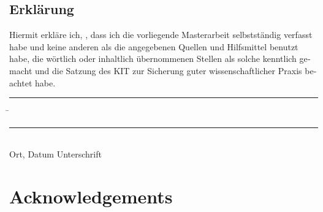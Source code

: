 \documentclass[parskip=no,12pt,a4paper,twoside,headings=openright, fleqn]{scrreprt}
\begin{document}



\begin{otherlanguage}{ngerman}
\chapter*{Erklärung}
\pagestyle{empty}

  \vspace{20mm}
  Hiermit erkläre ich, \theauthor, dass ich die vorliegende Masterarbeit selbst\-ständig
verfasst habe und keine anderen als die angegebenen Quellen und Hilfsmittel
benutzt habe, die wörtlich oder inhaltlich übernommenen Stellen als solche kenntlich gemacht und
die Satzung des KIT zur Sicherung guter wissenschaftlicher Praxis beachtet habe.
  \vspace{20mm}
  \begin{tabbing}
  \rule{7cm}{.4pt}\hspace{1cm} \= \rule{6.8cm}{.4pt} \\
 Ort, Datum \> Unterschrift
  \end{tabbing}
\end{otherlanguage}

\chapter*{Acknowledgements}
\pagestyle{empty}
\end{document}
